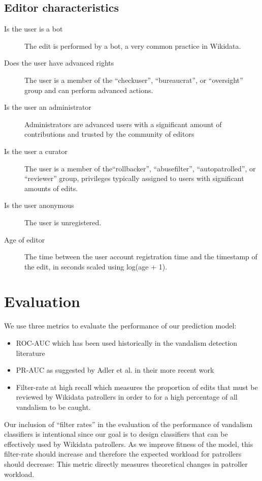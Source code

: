 \documentclass{sig-alternate-2013}
\begin{document}
\subsection{Editor characteristics}
\begin{description}
\item[Is the user is a bot]  The edit is performed by a bot, a very common practice in Wikidata.
\item[Does the user have advanced rights]  The user is a member of the ``checkuser'', ``bureaucrat'', or ``oversight'' group and can perform advanced actions.
\item[Is the user an administrator] Administrators are advanced users with a significant amount of contributions and trusted by the community of editors
\item[Is the user a curator]  The user is a member of the``rollbacker'', ``abusefilter'', ``autopatrolled'', or ``reviewer'' group, privileges typically assigned to users with significant amounts of edits.
\item[Is the user anonymous]  The user is unregistered.
\item[Age of editor] The time between the user account registration time and the timestamp of the edit, in seconds scaled using log(age + 1).
\end{description}

\section{Evaluation}
We use three metrics to evaluate the performance of our prediction model:
\begin{itemize}
\item ROC-AUC which has been used historically in the vandalism detection literature \cite{adler:detecting, wang:got}
\item PR-AUC as suggested by Adler et al. in their more recent work \cite{adler:wikipedia}
\item Filter-rate at high recall which measures the proportion of edits that must be reviewed by Wikidata patrollers in order to for a high percentage of all vandalism to be caught.
\end{itemize}

Our inclusion of ``filter rates'' in the evaluation of the performance of vandalism classifiers is intentional since our goal is to design classifiers that can be effectively used by Wikidata patrollers.  As we improve fitness of the model, this filter-rate should increase and therefore the expected workload for patrollers should decrease: This metric directly measures theoretical changes in patroller workload.
\end{document}
